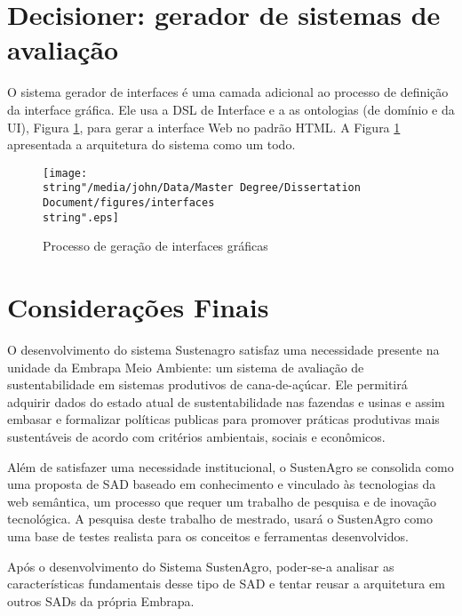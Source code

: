 \section{Decisioner: gerador de sistemas de avaliação}

O sistema gerador de interfaces é uma camada adicional ao processo
de definição da interface gráfica. Ele usa a DSL de Interface e a
as ontologias (de domínio e da UI), Figura \ref{fig:interfaces},
para gerar a interface Web no padrão HTML. A Figura \ref{fig:interfaces}
apresentada a arquitetura do sistema como um todo.

\begin{figure}[H]
\centering{}\texttt{[image: \\string"/media/john/Data/Master Degree/Dissertation Document/figures/interfaces\\string".eps]}\caption{Processo de geração de interfaces gráficas\label{fig:interfaces}}
\end{figure}


\section{Considerações Finais}

O desenvolvimento do sistema Sustenagro satisfaz uma necessidade presente
na unidade da Embrapa Meio Ambiente: um sistema de avaliação de sustentabilidade
em sistemas produtivos de cana-de-açúcar. Ele permitirá adquirir dados
do estado atual de sustentabilidade nas fazendas e usinas e assim
embasar e formalizar políticas publicas para promover práticas produtivas
mais sustentáveis de acordo com critérios ambientais, sociais e econômicos.

Além de satisfazer uma necessidade institucional, o SustenAgro se
consolida como uma proposta de SAD baseado em conhecimento e vinculado
às tecnologias da web semântica, um processo que requer um trabalho
de pesquisa e de inovação tecnológica. A pesquisa deste trabalho de
mestrado, usará o SustenAgro como uma base de testes realista para
os conceitos e ferramentas desenvolvidos. 

Após o desenvolvimento do Sistema SustenAgro, poder-se-a analisar
as características fundamentais desse tipo de SAD e tentar reusar
a arquitetura em outros SADs da própria Embrapa.
